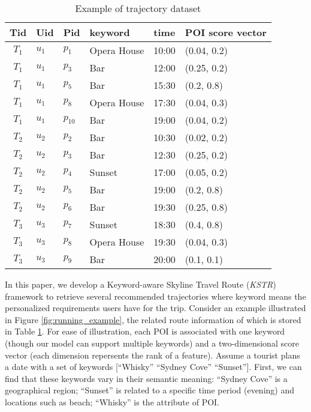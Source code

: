 \begin{table}[t]
 \centering
 \caption{Example of trajectory dataset}
 \begin{footnotesize}
 \begin{tabular}{|c|l|l|l|l|l|} \hline
 Tid & Uid & Pid & keyword & time & POI score vector\\ \hline
 $T_{1}$ & $u_{1}$ & $p_{1}$ & Opera House & 10:00 & (0.04, 0.2) \\ \hline
 $T_{1}$ & $u_{1}$ & $p_{3}$ & Bar & 12:00 & (0.25, 0.2) \\ \hline
 $T_{1}$ & $u_{1}$ & $p_{5}$ & Bar & 15:30 & (0.2, 0.8) \\ \hline
 $T_{1}$ & $u_{1}$ & $p_{8}$ & Opera House & 17:30 & (0.04, 0.3) \\ \hline
 $T_{1}$ & $u_{1}$ & $p_{10}$ & Bar & 19:00 & (0.04, 0.2) \\ \hline
 $T_{2}$ & $u_{2}$ & $p_{2}$ & Bar & 10:30 & (0.02, 0.2) \\ \hline
 $T_{2}$ & $u_{2}$ & $p_{3}$ & Bar & 12:30 & (0.25, 0.2) \\ \hline
 $T_{2}$ & $u_{2}$ & $p_{4}$ & Sunset & 17:00 & (0.05, 0.2) \\ \hline
 $T_{2}$ & $u_{2}$ & $p_{5}$ & Bar & 19:00 & (0.2, 0.8) \\ \hline
 $T_{2}$ & $u_{2}$ & $p_{6}$ & Bar & 19:30 & (0.25, 0.8) \\ \hline
 $T_{3}$ & $u_{3}$ & $p_{7}$ & Sunset & 18:30 & (0.4, 0.8) \\ \hline
 $T_{3}$ & $u_{3}$ & $p_{8}$ & Opera House & 19:30 & (0.04, 0.3) \\ \hline
 $T_{3}$ & $u_{3}$ & $p_{9}$ & Bar & 20:00 & (0.1, 0.1) \\ \hline
 \end{tabular}
 \end{footnotesize}
 \label{Tab:intro_tra}
 \vspace{-5mm}
 \end{table}

In this paper, we develop a Keyword-aware Skyline Travel Route (\textit{KSTR}) framework to retrieve several recommended trajectories where keyword means the personalized requirements users have for the trip. Consider an example illustrated in Figure \ref{fig:running_example}, the related route information of which is stored in Table \ref{Tab:intro_tra}. For ease of illustration, each POI is associated with one keyword (though our model can support multiple keywords) and a two-dimensional score vector (each dimension repersents the rank of a feature). Assume a tourist plans a date with a set of keywords [``Whisky'' ``Sydney Cove'' ``Sunset'']. First, we can find that these keywords vary in their semantic meaning: ``Sydney Cove'' is a geographical region; ``Sunset'' is related to a specific time period (evening) and locations such as beach; ``Whisky'' is the attribute of POI. 


